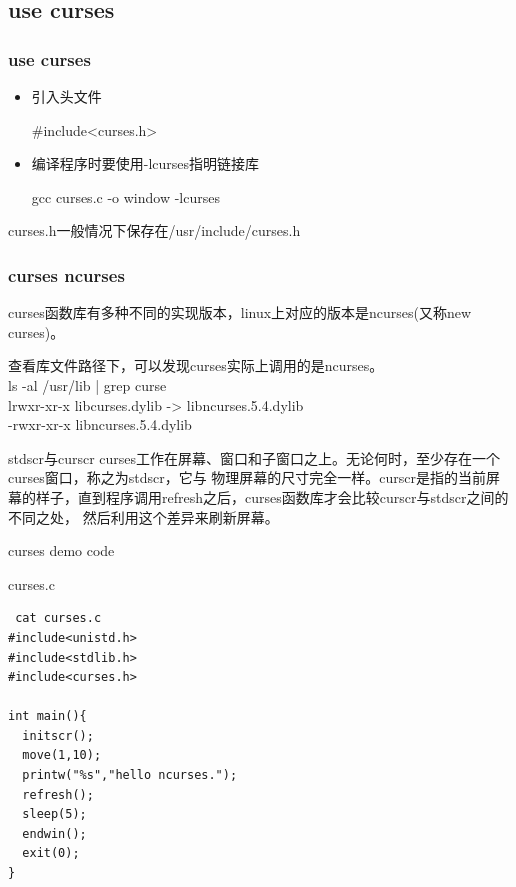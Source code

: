 \documentclass{beamer}
\begin{document}
\subsection{use curses}
\begin{frame}
\frametitle{use curses}
\begin{itemize}
\item
引入头文件

\#include<curses.h>
\item
编译程序时要使用-lcurses指明链接库

gcc curses.c -o window -lcurses
\end{itemize}
curses.h一般情况下保存在/usr/include/curses.h
\end{frame}
\begin{frame}
\frametitle{curses ncurses}
curses函数库有多种不同的实现版本，linux上对应的版本是ncurses(又称new curses)。

查看库文件路径下，可以发现curses实际上调用的是ncurses。\\
ls -al /usr/lib | grep curse\\
lrwxr-xr-x     libcurses.dylib -> libncurses.5.4.dylib\\

-rwxr-xr-x    libncurses.5.4.dylib

\end{frame}
\begin{frame}{stdscr与curscr}
curses工作在屏幕、窗口和子窗口之上。无论何时，至少存在一个curses窗口，称之为stdscr，它与
物理屏幕的尺寸完全一样。curscr是指的当前屏幕的样子，直到程序调用refresh之后，curses函数库才会比较curscr与stdscr之间的不同之处，
然后利用这个差异来刷新屏幕。
\end{frame}
\begin{frame}[fragile]{curses demo code}
\begin{block}{curses.c}
\begin{lstlisting}
 cat curses.c 
#include<unistd.h>
#include<stdlib.h>
#include<curses.h>

int main(){
  initscr();
  move(1,10);
  printw("%s","hello ncurses.");
  refresh();
  sleep(5);
  endwin();
  exit(0);
}
\end{lstlisting}
\end{block}
\end{frame}
\end{document}
